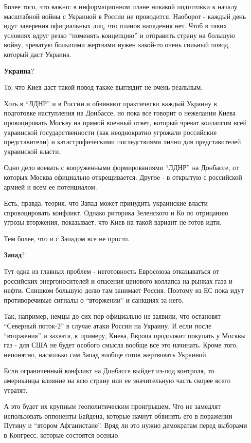 Более того, что важно: в информационном плане никакой подготовки к началу
масштабной войны с Украиной в России не проводится. Наоборот - каждый день идут
заверения официальных лиц, что планов нападения нет. Чтоб в таких условиях
вдруг резко \enquote{поменять концепцию} и отправить страну на большую войну, чреватую
большими жертвами нужен какой-то очень сильный повод, который даст Украина.

\textbf{Украина}? 

То, что Киев даст такой повод также выглядит не очень реальным.

Хоть в \enquote{ЛДНР} и в России и обвиняют практически каждый Украину в подготовке
наступления на Донбассе, но пока все говорит о нежелании Киева провоцировать
Москву на прямой военный ответ, который чреват коллапсом всей украинской
государственности (как неоднократно угрожали российские представители) и
катастрофическими последствиями лично для представителей украинской власти.

Одно дело воевать с вооруженными формированиями \enquote{ЛДНР} на Донбассе, от которых
Москва официально открещивается. Другое - в открытую с российской армией и всем
ее потенциалом.

Есть, правда, теория, что Запад может принудить украинские власти
спровоцировать конфликт. Однако риторика Зеленского и Ко по отрицанию угрозы
вторжения, показывает, что Киев на такой вариант не готов идти. 

Тем более, что и с Западом все не просто.

\textbf{Запад}? 

Тут одна из главных проблем - неготовность Евросоюза отказываться от российских
энергоносителей и опасения ценового коллапса на рынках газа и нефти. Слишком
большую долю там занимает Россия. Поэтому из ЕС пока идут противоречивые
сигналы о \enquote{вторжении} и санкциях за него. 

Так, например, немцы до сих пор официально не заявили, что остановят \enquote{Северный
поток-2} в случае атаки России на Украину. И если после \enquote{вторжения} и захвата,
к примеру, Киева, Европа продолжит покупать у Москвы газ - для США не будет
особого смысла вообще все это начинать. Кроме того, непонятно, насколько сам
Запад вообще готов жертвовать Украиной.

Если ограниченный конфликт на Донбассе выйдет из-под контроля, то американцы
влияние на всю страну или ее значительную часть скорее всего утратят.

А это будет их крупным геополитическим проигрышем. Что не замедлят использовать
оппоненты Байдена, которые начнут обвинять его в поражении Путину и \enquote{втором
Афганистане}. Вряд ли это нужно демократам перед выборами в Конгресс, которые
состоятся осенью. 

